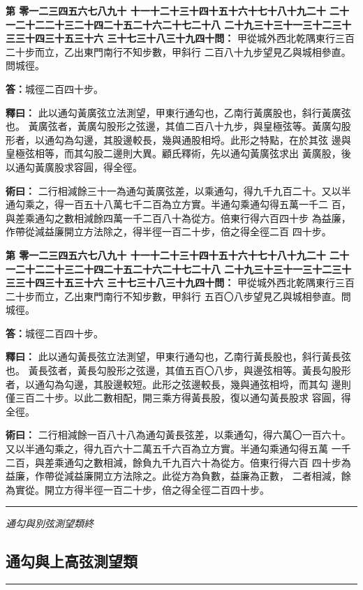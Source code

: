 \documentclass[11pt,a4paper]{article}
\newcommand{\longline}{\noindent\rule{\textwidth}{0.4pt}}
\newcounter{probnum}
\newcommand{\chnum}[1]{%
  \ifcase#1 零\or 一\or 二\or 三\or 四\or 五\or 六\or 七\or 八\or 九\or 十\or
    十一\or 十二\or 十三\or 十四\or 十五\or 十六\or 十七\or 十八\or 十九\or 二十\or
    二十一\or 二十二\or 二十三\or 二十四\or 二十五\or 二十六\or 二十七\or 二十八\or
    二十九\or 三十\or 三十一\or 三十二\or 三十三\or 三十四\or 三十五\or 三十六\or
    三十七\or 三十八\or 三十九\or 四十\fi}
\newcommand{\problem}[1]{\stepcounter{probnum}\par\noindent\textbf{第\chnum{\value{probnum}}問：}#1\par}
\newcommand{\answer}[1]{\par\noindent\textbf{答：}#1\par}
\newcommand{\shiyi}[1]{\par\noindent\textbf{釋曰：}#1\par}
\newcommand{\shuyue}[1]{\par\noindent\textbf{術曰：}#1\par}
\begin{document}
\vspace{0.3cm}
\problem{
甲從城外西北乾隅東行三百二十步而立，乙出東門南行不知步數，甲斜行
二百八十九步望見乙與城相參直。問城徑。
}

\answer{城徑二百四十步。}

\shiyi{
此以通勾黃廣弦立法測望，甲東行通勾也，乙南行黃廣股也，斜行黃廣弦也。
黃廣弦者，黃廣勾股形之弦邊，其值二百八十九步，與皇極弦等。黃廣勾股
形者，以通勾為勾邊，其股邊較長，幾與通股相埒。此形之特點，在於其弦
邊與皇極弦相等，而其勾股二邊則大異。顧氏釋術，先以通勾黃廣弦求出
黃廣股，後以通勾黃廣股求容圓，得全徑。
}

\shuyue{
二行相減餘三十一為通勾黃廣弦差，以乘通勾，得九千九百二十。又以半
通勾乘之，得一百五十八萬七千二百為立方實。半通勾乘通勾得五萬一千二
百，與差乘通勾之數相減餘四萬一千二百八十為從方。倍東行得六百四十步
為益廉，作帶從減益廉開立方法除之，得半徑一百二十步，倍之得全徑二百
四十步。
}

\vspace{0.3cm}
\problem{
甲從城外西北乾隅東行三百二十步而立，乙出東門南行不知步數，甲斜行
五百〇八步望見乙與城相參直。問城徑。
}

\answer{城徑二百四十步。}

\shiyi{
此以通勾黃長弦立法測望，甲東行通勾也，乙南行黃長股也，斜行黃長弦也。
黃長弦者，黃長勾股形之弦邊，其值五百〇八步，與邊弦相等。黃長勾股形
者，以通勾為勾邊，其股邊較短。此形之弦邊較長，幾與通弦相埒，而其勾
邊則僅三百二十步。以此二數相配，開三乘方得黃長股，復以通勾黃長股求
容圓，得全徑。
}

\shuyue{
二行相減餘一百八十八為通勾黃長弦差，以乘通勾，得六萬〇一百六十。
又以半通勾乘之，得九百六十二萬五千六百為立方實。半通勾乘通勾得五萬
一千二百，與差乘通勾之數相減，餘負九千九百六十為從方。倍東行得六百
四十步為益廉，作帶從減益廉開立方法除之。此從方為負數，益廉為正數，
二者相減，餘為實從。開立方得半徑一百二十步，倍之得全徑二百四十步。
}

\vspace{0.5cm}
\longline
\begin{center}
\textit{通勾與別弦測望類終}
\end{center}

\newpage
\setcounter{probnum}{0}

\subsection*{通勾與上高弦測望類}
\vspace{0.3cm}
\longline
\vspace{0.3cm}
\end{document}

